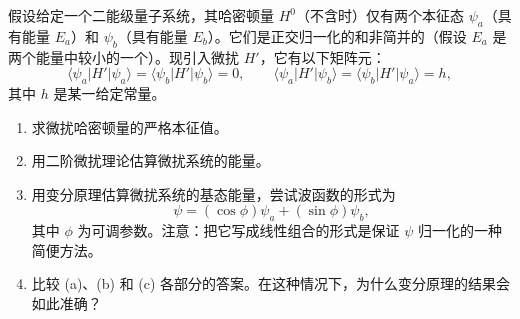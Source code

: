\begin{question}
假设给定一个二能级量子系统，其哈密顿量 $H^0$（不含时）仅有两个本征态 $\psi_a$（具有能量 $E_a$）和 $\psi_b$（具有能量 $E_b$）。它们是正交归一化的和非简并的（假设 $E_a$ 是两个能量中较小的一个）。现引入微扰 $H'$，它有以下矩阵元：
\[
\langle\psi_a|H'|\psi_a\rangle=\langle\psi_b|H'|\psi_b\rangle=0,\qquad
\langle\psi_a|H'|\psi_b\rangle=\langle\psi_b|H'|\psi_a\rangle=h,
\]
其中 $h$ 是某一给定常量。
\begin{enumerate}
\item 求微扰哈密顿量的严格本征值。
\item 用二阶微扰理论估算微扰系统的能量。
\item 用变分原理估算微扰系统的基态能量，尝试波函数的形式为
\[
\psi=(\cos\phi)\psi_a+(\sin\phi)\psi_b,
\]
其中 $\phi$ 为可调参数。注意：把它写成线性组合的形式是保证 $\psi$ 归一化的一种简便方法。
\item 比较 (a)、(b) 和 (c) 各部分的答案。在这种情况下，为什么变分原理的结果会如此准确？
\end{enumerate}
\end{question}
